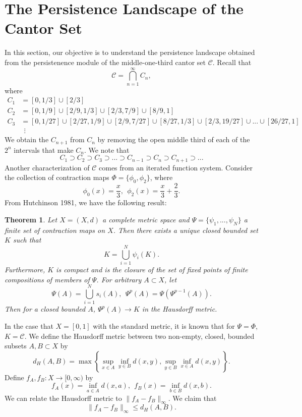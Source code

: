 \documentclass [52pt] {article}
\newtheorem{theorem}{Theorem}
\begin{document}
\section{The Persistence Landscape of the Cantor Set}
In this section, our objective is to understand the persistence landscape obtained from the persistenence module of the middle-one-third cantor set $\mathcal{C}$.  Recall that 
\[\mathcal{C} = \bigcap_{n=1}^\infty C_n,\]
where 
\[\begin{split}
C_1 &= [0,1/3]\cup [2/3]\\
C_2 &= [0,1/9]\cup[2/9,1/3]\cup [2/3,7/9]\cup[8/9,1]\\
C_3 & = [0,1/27]\cup[2/27,1/9]\cup[2/9,7/27]\cup[8/27,1/3]\cup[2/3,19/27]\cup ...\cup [26/27,1]\\
&\:\:\vdots
\end{split}\]
We obtain the $C_{n+1}$ from $C_n$ by removing the open middle third of each of the $2^n$ intervals that make $C_n$.  We note that 
\[C_1 \supset C_2 \supset C_3\supset ...\supset C_{n-1}\supset C_n \supset C_{n+1}\supset ...\]
Another characterization of $\mathcal{C}$ comes from an iterated function system.  Consider the collection of contraction maps $\Phi = \{\phi_0,\phi_2\}$, where
\[\phi_0(x) = \frac{x}{3},\:\:\phi_2(x) = \frac{x}{3}+\frac{2}{3}.\]
From Hutchinson 1981, we have the following result:
\begin{theorem}\label{thm : Hutch1981}
Let $X = (X,d)$ a complete metric space and $\Psi = \{\psi_1,...,\psi_N\}$ a finite set of contraction maps on $X$.  Then there exists a unique closed bounded set $K$ such that
\[K = \bigcup_{i=1}^N \psi_i(K).\]
Furthermore, $K$ is compact and is the closure of the set of fixed points of finite compositions of members of $\Psi$.  For arbitrary $A\subset X$, let 
\[\Psi(A) = \bigcup_{i=1}^N s_i(A),\:\: \Psi^p(A) = \Psi(\Psi^{p-1}(A)).\]
Then for a closed bounded $A$, $\Psi^p(A)\to K$ in the Hausdorff metric.
\end{theorem}
In the case that $X= [0,1]$ with the standard metric, it is known that for $\Psi = \Phi$, $K = \mathcal{C}$.  We define the Hausdorff metric between two non-empty, closed, bounded subsets $A,B\subset X$ by
\[d_H(A,B) = \max\left\{\sup_{x\in A}\inf_{y\in B}d(x,y),\sup_{y\in B}\inf_{x\in A}d(x,y)\right\}.\]
Define $f_A,f_B:X\to[0,\infty)$ by
\[f_A(x) = \inf_{a\in A}d(x,a),\:\:f_B(x) = \inf_{b\in B}d(x,b).\]
We can relate the Hausdorff metric to $\|f_A - f_B\|_\infty$.  We claim that
\begin{equation}
\|f_A -f_B\|_\infty \le d_H(A,B).
\end{equation}
\end{document}
